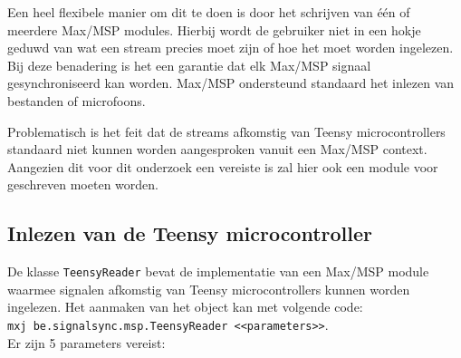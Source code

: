 Een heel flexibele manier om dit te doen is door het schrijven van één of meerdere Max/MSP modules. Hierbij wordt de gebruiker niet in een hokje geduwd van wat een stream precies moet zijn of hoe het moet worden ingelezen. Bij deze benadering is het een garantie dat elk Max/MSP signaal gesynchroniseerd kan worden. Max/MSP ondersteund standaard het inlezen van bestanden of microfoons.

Problematisch is het feit dat de streams afkomstig van Teensy microcontrollers standaard niet kunnen worden aangesproken vanuit een Max/MSP context. Aangezien dit voor dit onderzoek een vereiste is zal hier ook een module voor geschreven moeten worden.

\subsection{Inlezen van de Teensy microcontroller}

De klasse \texttt{TeensyReader} bevat de implementatie van een Max/MSP module waarmee signalen afkomstig van Teensy microcontrollers kunnen worden ingelezen. Het aanmaken van het object kan met volgende code:\\
\mbox{\texttt{mxj\textapprox\ be.signalsync.msp.TeensyReader <<parameters>>}}.\\Er zijn 5 parameters vereist:

